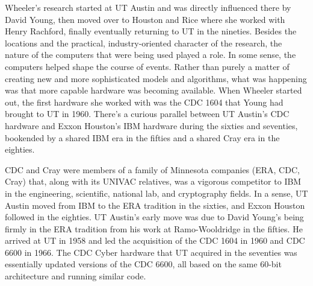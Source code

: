 Wheeler’s research started at UT Austin and was directly influenced there by David Young, then moved over to Houston and Rice where she worked with Henry Rachford, finally eventually returning to UT in the nineties. Besides the locations and the practical, industry-oriented character of the research, the nature of the computers that were being used played a role. In some sense, the computers helped shape the course of events. Rather than purely a matter of creating new and more sophisticated models and algorithms, what was happening was that more capable hardware was becoming available. When Wheeler started out, the first hardware she worked with was the CDC 1604 that Young had brought to UT in 1960. There's a curious parallel between UT Austin's CDC hardware and Exxon Houston's IBM hardware during the sixties and seventies, bookended by a shared IBM era in the fifties and a shared Cray era in the eighties.
 
CDC and Cray were members of a family of Minnesota companies (ERA, CDC, Cray) that, along with its UNIVAC relatives, was a vigorous competitor to IBM in the engineering, scientific, national lab, and cryptography fields. In a sense, UT Austin moved from IBM to the ERA tradition in the sixties, and Exxon Houston followed in the eighties. UT Austin's early move was due to David Young's being firmly in the ERA tradition from his work at Ramo-Wooldridge in the fifties. He arrived at UT in 1958 and led the acquisition of the CDC 1604 in 1960 and CDC 6600 in 1966. The CDC Cyber hardware that UT acquired in the seventies was essentially updated versions of the CDC 6600, all based on the same 60-bit architecture and running similar code.

